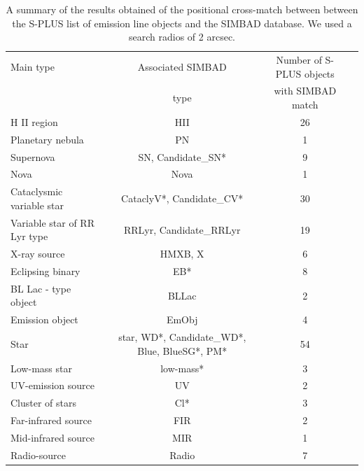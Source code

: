 \documentclass[fleqn,usenatbib]{mnras}
\begin{document}
{\begin{table}
\centering
\caption{A summary of the results obtained of the positional cross-match between
         between the S-PLUS list of emission line objects and the SIMBAD database.
          We used a search radios of 2 arcsec. 
                                               }
\label{tab:simbad-sources}
\begin{tabular}{lccc} %
  \hline
Main type    & Associated SIMBAD           & Number of S-PLUS objects                 \\
             & type                        &  with SIMBAD match               \\
\hline
H II region                & HII                     & 26                \\
Planetary nebula           & PN                      & 1                 \\
Supernova                  & SN, Candidate\_SN*      & 9                 \\
Nova                       & Nova                    & 1                 \\
Cataclysmic variable star  & CataclyV*, Candidate\_CV* & 30              \\
Variable star of RR Lyr type & RRLyr, Candidate\_RRLyr & 19              \\
X-ray source                & HMXB, X                  & 6               \\
Eclipsing binary            & EB*                    & 8                 \\            
BL Lac - type object        & BLLac                  & 2                 \\
Emission object             & EmObj                  & 4                 \\
Star                        & star, WD*, Candidate\_WD*, Blue, BlueSG*, PM* & 54 \\
Low-mass star               & low-mass*              & 3                 \\
UV-emission source          & UV                     & 2                 \\
Cluster of stars            & Cl*                    & 3                 \\
Far-infrared source         & FIR                    & 2                 \\
Mid-infrared source         & MIR                    & 1                 \\
Radio-source                & Radio                  & 7                 \\

\end{tabular}
\end{table}}
\end{document}
